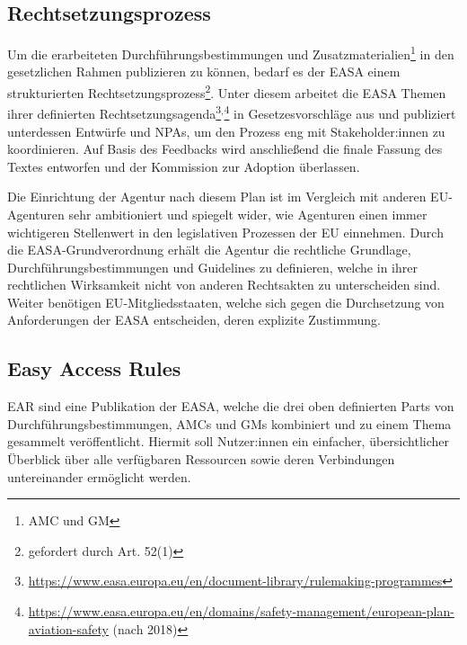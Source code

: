\subsection{Rechtsetzungsprozess}

    Um die erarbeiteten Durchführungsbestimmungen und Zusatzmaterialien\footnote{\ac{AMC} und \ac{GM}} in den gesetzlichen Rahmen publizieren zu können, bedarf es der \ac{EASA} einem strukturierten Rechtsetzungsprozess\footnote{gefordert durch Art. 52(1) }.
    Unter diesem arbeitet die \ac{EASA} Themen ihrer definierten Rechtsetzungsagenda\footnote{\href{https://www.easa.europa.eu/en/document-library/rulemaking-programmes}{https://www.easa.europa.eu/en/document-library/rulemaking-programmes}}$^,$\footnote{\href{https://www.easa.europa.eu/en/domains/safety-management/european-plan-aviation-safety}{https://www.easa.europa.eu/en/domains/safety-management/european-plan-aviation-safety} (nach 2018)} in Gesetzesvorschläge aus und publiziert unterdessen Entwürfe und \acfp{NPA}, um den Prozess eng mit Stakeholder:innen zu koordinieren.
    Auf Basis des Feedbacks wird anschließend die finale Fassung des Textes entworfen und der Kommission zur Adoption überlassen. \cite[3]{easa_2017001r} 
        
    \pagebreak
    \noindent
    Die Einrichtung der Agentur nach diesem Plan ist im Vergleich mit anderen \ac{EU}-Agenturen sehr ambitioniert und spiegelt wider, wie Agenturen einen immer wichtigeren Stellenwert in den legislativen Prozessen der \ac{EU} einnehmen. 
    Durch die \ac{EASA}-Grundverordnung erhält die Agentur die rechtliche Grundlage, Durchführungsbestimmungen und Guidelines zu definieren, welche in ihrer rechtlichen Wirksamkeit nicht von anderen Rechtsakten zu unterscheiden sind.
    Weiter benötigen \ac{EU}-Mitgliedsstaaten, welche sich gegen die Durchsetzung von Anforderungen der \ac{EASA} entscheiden, deren explizite Zustimmung.   
    \cite[260]{easa_administrative_innovation}
            

\subsection{Easy Access Rules}

    \acf{EAR} sind eine Publikation der \ac{EASA}, welche die drei oben definierten Parts von Durchführungsbestimmungen, \acp{AMC} und \acp{GM} kombiniert und zu einem Thema gesammelt veröffentlicht.
    Hiermit soll Nutzer:innen ein einfacher, übersichtlicher Überblick über alle verfügbaren Ressourcen sowie deren Verbindungen untereinander ermöglicht werden.
    

